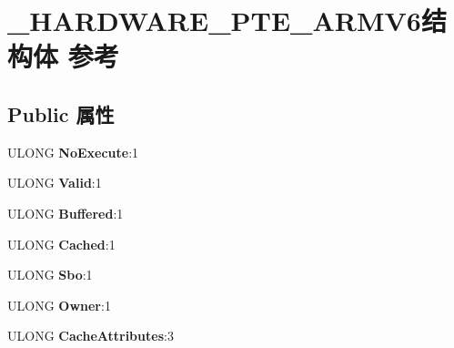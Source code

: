 \hypertarget{struct___h_a_r_d_w_a_r_e___p_t_e___a_r_m_v6}{}\section{\+\_\+\+H\+A\+R\+D\+W\+A\+R\+E\+\_\+\+P\+T\+E\+\_\+\+A\+R\+M\+V6结构体 参考}
\label{struct___h_a_r_d_w_a_r_e___p_t_e___a_r_m_v6}
\subsection*{Public 属性}
\begin{DoxyCompactItemize}
\item 
\mbox{\label{struct___h_a_r_d_w_a_r_e___p_t_e___a_r_m_v6_a4c83f82a641539afefc93388465bb98d}} 
U\+L\+O\+NG {\bfseries No\+Execute}\+:1
\item 
\mbox{\label{struct___h_a_r_d_w_a_r_e___p_t_e___a_r_m_v6_ad81f199a753f97ade49e428feb235d9d}} 
U\+L\+O\+NG {\bfseries Valid}\+:1
\item 
\mbox{\label{struct___h_a_r_d_w_a_r_e___p_t_e___a_r_m_v6_aec2e57fd5caedc03cf08de0bccbc66d3}} 
U\+L\+O\+NG {\bfseries Buffered}\+:1
\item 
\mbox{\label{struct___h_a_r_d_w_a_r_e___p_t_e___a_r_m_v6_aad42b88eb02352b795ba21bb970b2320}} 
U\+L\+O\+NG {\bfseries Cached}\+:1
\item 
\mbox{\label{struct___h_a_r_d_w_a_r_e___p_t_e___a_r_m_v6_a19fed8feeb24a41d3e2eb9874c51369c}} 
U\+L\+O\+NG {\bfseries Sbo}\+:1
\item 
\mbox{\label{struct___h_a_r_d_w_a_r_e___p_t_e___a_r_m_v6_ab636a068b43306bcee29c3cdce6bfb6a}} 
U\+L\+O\+NG {\bfseries Owner}\+:1
\item 
\mbox{\label{struct___h_a_r_d_w_a_r_e___p_t_e___a_r_m_v6_a288042ac4b0b991ec1d8b3583f652559}} 
U\+L\+O\+NG {\bfseries Cache\+Attributes}\+:3

\end{DoxyCompactItemize}
